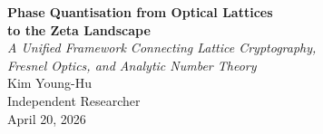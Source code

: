\documentclass[11pt, a4paper]{article}
\theoremstyle{definition}
\theoremstyle{plain}
\begin{document}
\begin{center}
  {\LARGE\bfseries Phase Quantisation from Optical Lattices\\[4pt]
   to the Zeta Landscape}\\[14pt]
  {\large\itshape A Unified Framework Connecting Lattice Cryptography,\\
   Fresnel Optics, and Analytic Number Theory}\\[20pt]
  {\large Kim Young-Hu}\\[4pt]
  {\normalsize Independent Researcher}\\[4pt]
  {\small April 20, 2026}
\end{center}

\vspace{1.5em}
\end{document}
